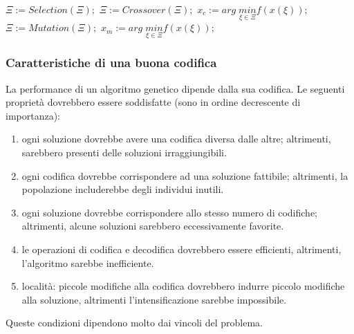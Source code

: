\documentclass{article}
\begin{document}
\begin{algorithm}[H]
    \caption{$GeneticAlgorithm(I,X^{(0)})$}
    \label{alg:ga}
    \begin{algorithmic}
            \State $\Xi:=Selection(\Xi);$
            \State $\Xi:=Crossover(\Xi);$
            \State $x_c:=arg\;\underset{\xi\in\Xi}{min}f(x(\xi));$
            \EndIf
            \State $\Xi:=Mutation(\Xi);$
            \State $x_m:=arg\;\underset{\xi\in\Xi}{min}f(x(\xi));$
            \EndIf
        \EndFor
    \end{algorithmic}
\end{algorithm}

\subsubsection{Caratteristiche di una buona codifica}
La performance di un algoritmo genetico dipende dalla sua codifica. Le seguenti
proprietà dovrebbero essere soddisfatte (sono in ordine decrescente di importanza):
\begin{enumerate}
    \item ogni soluzione dovrebbe avere una codifica diversa dalle altre; altrimenti,
    sarebbero presenti delle soluzioni irraggiungibili.

    \item ogni codifica dovrebbe corrispondere ad una soluzione fattibile; altrimenti,
    la popolazione includerebbe degli individui inutili.
    \item ogni soluzione dovrebbe corrispondere allo stesso numero di codifiche;
    altrimenti, alcune soluzioni sarebbero eccessivamente favorite.
    \item le operazioni di codifica e decodifica dovrebbero essere efficienti, altrimenti,
    l'algoritmo sarebbe inefficiente.
    \item località: piccole modifiche alla codifica dovrebbero indurre piccolo modifiche
    alla soluzione, altrimenti l'intensificazione sarebbe impossibile.
\end{enumerate}
Queste condizioni dipendono molto dai vincoli del problema.
\end{document}
